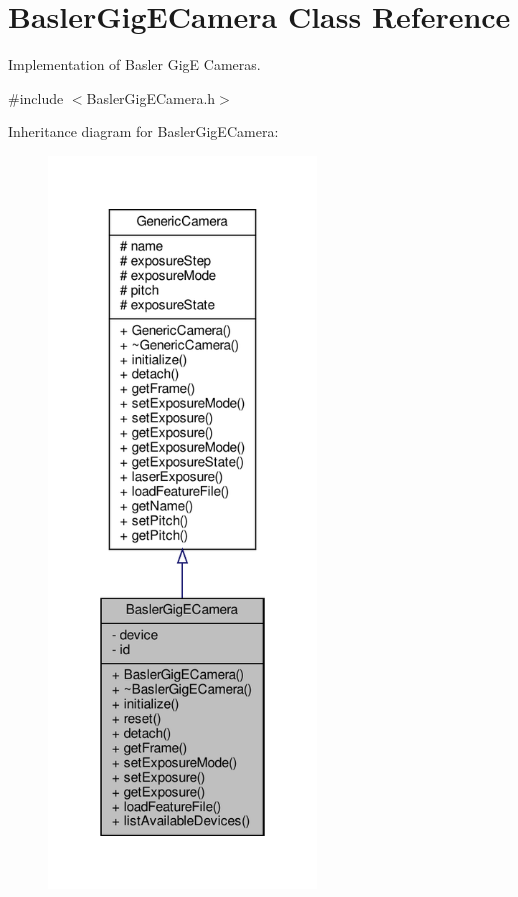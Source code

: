 \hypertarget{class_basler_gig_e_camera}{}\section{Basler\+Gig\+E\+Camera Class Reference}
\label{class_basler_gig_e_camera}


Implementation of Basler GigE Cameras.  




{\ttfamily \#include $<$Basler\+Gig\+E\+Camera.\+h$>$}



Inheritance diagram for Basler\+Gig\+E\+Camera\+:
\nopagebreak
\begin{figure}[H]
\begin{center}
\leavevmode
\includegraphics[height=550pt]{class_basler_gig_e_camera__inherit__graph}
\end{center}
\end{figure}



